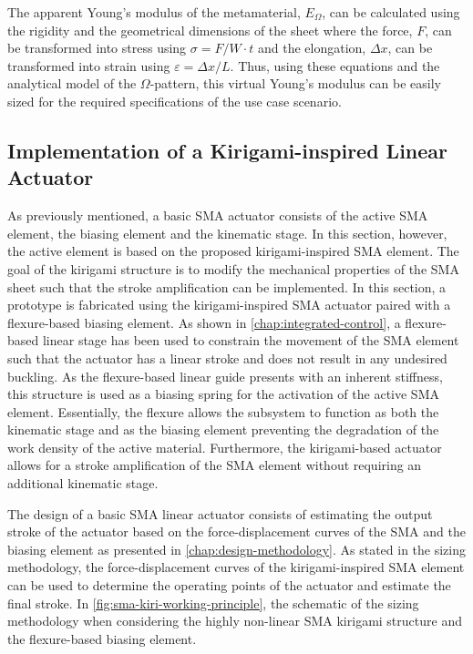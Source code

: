 The apparent Young's modulus of the metamaterial, $E_\Omega$, can be calculated using the rigidity and the geometrical dimensions of the sheet where the force, $F$, can be transformed into stress using $\sigma = F/W\cdot t$ and the elongation, $\Delta x$, can be transformed into strain using $\varepsilon = \Delta x/L$. Thus, using these equations and the analytical model of the $\Omega$-pattern, this virtual Young's modulus can be easily sized for the required specifications of the use case scenario.


\subsection{Implementation of a Kirigami-inspired Linear Actuator}
As previously mentioned, a basic SMA actuator consists of the active SMA element, the biasing element and the kinematic stage. In this section, however, the active element is based on the proposed kirigami-inspired SMA element. The goal of the kirigami structure is to modify the mechanical properties of the SMA sheet such that the stroke amplification can be implemented. In this section, a prototype is fabricated using the kirigami-inspired SMA actuator paired with a flexure-based biasing element. As shown in \cref{chap:integrated-control}, a flexure-based linear stage has been used to constrain the movement of the SMA element such that the actuator has a linear stroke and does not result in any undesired buckling. As the flexure-based linear guide presents with an inherent stiffness, this structure is used as a biasing spring for the activation of the active SMA element. Essentially, the flexure allows the subsystem to function as both the kinematic stage and as the biasing element preventing the degradation of the work density of the active material. Furthermore, the kirigami-based actuator allows for a stroke amplification of the SMA element without requiring an additional kinematic stage.

The design of a basic SMA linear actuator consists of estimating the output stroke of the actuator based on the force-displacement curves of the SMA and the biasing element as presented in \cref{chap:design-methodology}. As stated in the sizing methodology, the force-displacement curves of the kirigami-inspired SMA element can be used to determine the operating points of the actuator and estimate the final stroke. In \cref{fig:sma-kiri-working-principle}, the schematic of the sizing methodology when considering the highly non-linear SMA kirigami structure and the flexure-based biasing element.

